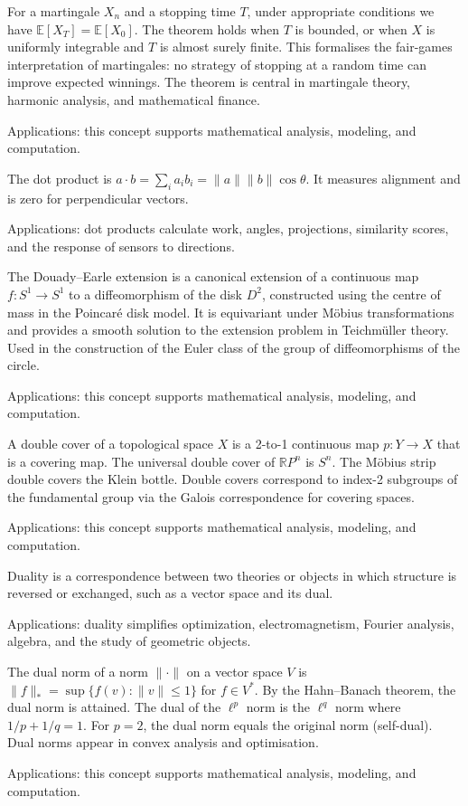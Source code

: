 For a martingale $X_n$ and a stopping time $T$, under appropriate conditions we have $\mathbb{E}[X_T] = \mathbb{E}[X_0]$. The theorem holds when $T$ is bounded, or when $X$ is uniformly integrable and $T$ is almost surely finite. This formalises the fair-games interpretation of martingales: no strategy of stopping at a random time can improve expected winnings. The theorem is central in martingale theory, harmonic analysis, and mathematical finance. \par\noindent Applications: this concept supports mathematical analysis, modeling, and computation.

The dot product is $a\cdot b=\sum_i a_ib_i=\|a\|\|b\|\cos\theta$. It measures alignment and is zero for perpendicular vectors. \par\noindent Applications: dot products calculate work, angles, projections, similarity scores, and the response of sensors to directions.

The Douady--Earle extension is a canonical extension of a continuous map $f: S^1 \to S^1$ to a diffeomorphism of the disk $D^2$, constructed using the centre of mass in the Poincaré disk model. It is equivariant under Möbius transformations and provides a smooth solution to the extension problem in Teichmüller theory. Used in the construction of the Euler class of the group of diffeomorphisms of the circle. \par\noindent Applications: this concept supports mathematical analysis, modeling, and computation.

A double cover of a topological space $X$ is a 2-to-1 continuous map $p: Y \to X$ that is a covering map. The universal double cover of $\mathbb{R}P^n$ is $S^n$. The Möbius strip double covers the Klein bottle. Double covers correspond to index-2 subgroups of the fundamental group via the Galois correspondence for covering spaces. \par\noindent Applications: this concept supports mathematical analysis, modeling, and computation.

Duality is a correspondence between two theories or objects in which structure is reversed or exchanged, such as a vector space and its dual. \par\noindent Applications: duality simplifies optimization, electromagnetism, Fourier analysis, algebra, and the study of geometric objects.

The dual norm of a norm $\|\cdot\|$ on a vector space $V$ is $\|f\|_* = \sup\{f(v) : \|v\| \leq 1\}$ for $f \in V^*$. By the Hahn--Banach theorem, the dual norm is attained. The dual of the $\ell^p$ norm is the $\ell^q$ norm where $1/p + 1/q = 1$. For $p = 2$, the dual norm equals the original norm (self-dual). Dual norms appear in convex analysis and optimisation. \par\noindent Applications: this concept supports mathematical analysis, modeling, and computation.

